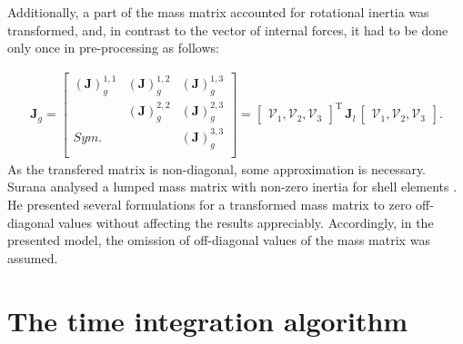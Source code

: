 \documentclass[11pt,a4paper,final]{report}
\theoremstyle{plain}
\begin{document}
Additionally, a part of the mass matrix accounted for rotational inertia was transformed, and, in contrast to the vector of internal forces, it had to be done only once in pre-processing as follows:

\begin{eqnarray}
	\textbf{J}_g=\left [ 
	\begin{array}{ccc}
		\left (\textbf{J}\right)^{1,1}_g & \left (\textbf{J}\right )^{1,2}_g & \left (\textbf{J}\right )^{1,3}_g\\
		& \left (\textbf{J}\right )^{2,2}_g & \left (\textbf{J}\right )^{2,3}_g\\
		Sym. &  & \left (\textbf{J}\right )^{3,3}_g\\
	\end{array}
	\right ]
	=\left[\begin{array}{ccc}
		\mathcal{V}_1, \mathcal{V}_2, \mathcal{V}_3 \end{array}\right ]^{\mathrm{T}}
	\,\textbf{J}_l\,
	\left[\begin{array}{ccc}
		\mathcal{V}_1, \mathcal{V}_2, \mathcal{V}_3 \end{array}\right ].
	\label{eq:inertia}
\end{eqnarray}
As the transfered matrix is non-diagonal, some approximation is necessary.
Surana analysed a lumped mass matrix with non-zero inertia for shell elements \cite{surana1980transition}.
He presented several formulations for a transformed mass matrix to zero off-diagonal values without affecting the results appreciably.
Accordingly, in the presented model, the omission of off-diagonal values of the mass matrix was assumed. \section{The time integration algorithm}
\label{sec:time}
\end{document}
